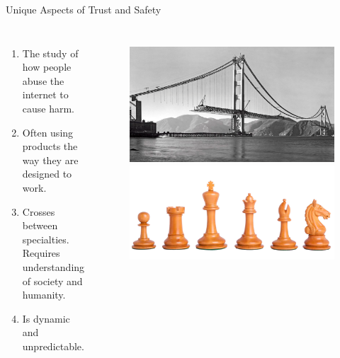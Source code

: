 \documentclass[nobackground,dvipsnames,table]{beamer}
\begin{document}
\begin{frame}{Unique Aspects of Trust and Safety}
    \begin{columns}
            \begin{enumerate}
                \item The study of how people abuse the internet to cause harm.
                \item Often using products the way they are designed to work.
                \item Crosses between specialties. Requires understanding of society and humanity.
                \item Is dynamic and unpredictable. 
            \end{enumerate}
            \begin{figure}
                \centering
                \includegraphics[width=\textwidth]{bridge-construction}
                \includegraphics[width=\textwidth]{chess}
            \end{figure}
        \end{columns}
\end{frame}

\begin{frame}{}
    \thispagestyle{empty}
\end{frame}
\end{document}
